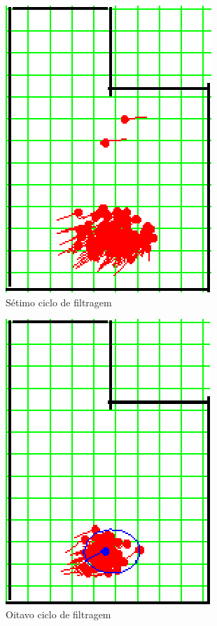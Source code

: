 \begin{figure}[H]
  \centering
  \includegraphics[scale=1]{figuras/cen2_ex5/8.eps}
  \caption[Sétimo Ciclo de Filtragem]{Sétimo ciclo de filtragem}
  \label{img:cen2_ex5_8}
\end{figure}


\begin{figure}[H]
  \centering
  \includegraphics[scale=1]{figuras/cen2_ex5/9.eps}
  \caption[Oitavo Ciclo de Filtragem]{Oitavo ciclo de filtragem}
  \label{img:cen2_ex5_9}
\end{figure}

